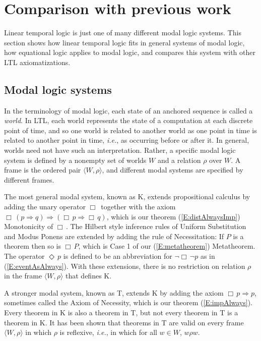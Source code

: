 \documentclass[12pt, fleqn, leqno]{article}
\newcommand{\impl}{\ensuremath{\Rightarrow}}        %
\newcommand{\Event}{\Diamond\,}
\newcommand{\Always}{\Box\,}
\begin{document}
\section{Comparison with previous work}\label{comparison-previous-work}

Linear temporal logic is just one of many different modal logic systems.
This section shows how linear temporal logic fits in general systems of modal logic, how equational logic applies to modal logic, and compares this system with other LTL axiomatizations.

\subsection{Modal logic systems}

In the terminology of modal logic, each state of an anchored sequence is called a \textit{world}.
In LTL, each world represents the state of a computation at each discrete point of time, and so one world is related to another world as one point in time is related to another point in time, \textit{i.e.}, as occurring before or after it.
In general, worlds need not have such an interpretation.
Rather, a specific modal logic system is defined by a nonempty set of worlds $W$ and a relation $\rho$ over $W$.
A frame is the ordered pair $\langle W,\rho\rangle$, and different modal systems are specified by different frames.

The most general modal system, known as K, extends propositional calculus by adding the unary operator $\Always$ together with the axiom $\Always (p\impl q)\impl(\Always p\impl\Always q)$, which is our theorem (\ref{E:distAlwaysImp}) Monotonicity of $\Always$.
The Hilbert style inference rules of Uniform Substitution and Modus Ponens are extended by adding the rule of Necessitation: If $P$ is a theorem then so is $\Always P$, which is Case 1 of our (\ref{E:metatheorem}) Metatheorem.
The operator $\Event p$ is defined to be an abbreviation for $\neg\Always\neg p$ as in (\ref{E:eventAsAlways}).
With these extensions, there is no restriction on relation $\rho$ in the frame $\langle W,\rho\rangle$ that defines K.

A stronger modal system, known as T, extends K by adding the axiom $\Always p\impl p$, sometimes called the Axiom of Necessity, which is our theorem (\ref{E:impAlways}).
Every theorem in K is also a theorem in T, but not every theorem in T is a theorem in K.
It has been shown that theorems in T are valid on every frame $\langle W,\rho\rangle$ in which $\rho$ is reflexive, \textit{i.e.}, in which for all $w\in W$, $w\rho w$. \cite{Hughes}
\end{document}
